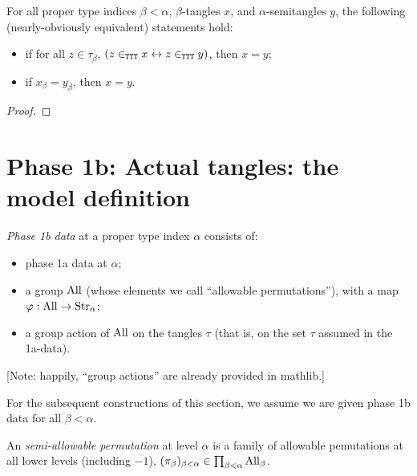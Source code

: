 \begin{theorem}
\label {thm:extensionality}
\leanok
For all proper type indices $\beta < \alpha$, $\beta$-tangles $x$, and $\alpha$-semitangles $y$, the following (nearly-obviously equivalent) statements hold:
\begin{itemize}
  \item if for all $z \in \tau_\beta$, $(z \in_{\tt TTT} x \leftrightarrow z \in_{\tt TTT} y)$, then $x=y$;
  \item if $x_\beta = y_\beta$, then $x=y$.
\end{itemize}
\end{theorem}
\begin{proof}\leanok\end{proof}

\section{Phase 1b: Actual tangles: the model definition}

\begin{definition}
  \label{def:phase-1b-data}
  \leanok
  \emph{Phase 1b data} at a proper type index $\alpha$ consists of:
  \begin{itemize}
  \item phase 1a data at $\alpha$;
  \item a group $\mathrm{All}$ (whose elements we call “allowable permutations”), with a map $\varphi : \mathrm{All} \to \mathrm{Str}_\alpha$;
  \item a group action of $\mathrm{All}$ on the tangles $\tau$ (that is, on the set $\tau$ assumed in the 1a-data).
  \end{itemize}
  [Note: happily, “group actions” are already provided in mathlib.]

  For the subsequent constructions of this section, we assume we are given phase 1b data for all $\beta < \alpha$.
\end{definition}

\begin{definition}
\label {def:semiallowable-perm}
\leanok
{}
  An \emph{semi-allowable permutation} at level $\alpha$ is a family of allowable pemutations at all lower levels (including $-1$), $(\pi_\beta)_{\beta < \alpha} \in \prod_{\beta < \alpha} \mathrm{All}_\beta$.
\end{definition}

